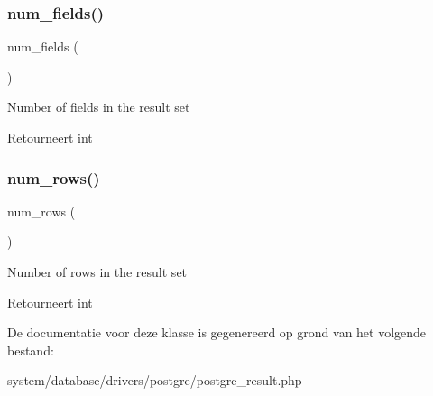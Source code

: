 \subsubsection{\texorpdfstring{num\_fields()}{num\_fields()}}
{\footnotesize\ttfamily num\+\_\+fields (\begin{DoxyParamCaption}{ }\end{DoxyParamCaption})}

Number of fields in the result set

\begin{DoxyReturn}{Retourneert}
int 
\end{DoxyReturn}
\mbox{\label{class_c_i___d_b__postgre__result_a218657c303ee499b97710ab0cd2f5d6e}} 
\subsubsection{\texorpdfstring{num\_rows()}{num\_rows()}}
{\footnotesize\ttfamily num\+\_\+rows (\begin{DoxyParamCaption}{ }\end{DoxyParamCaption})}

Number of rows in the result set

\begin{DoxyReturn}{Retourneert}
int 
\end{DoxyReturn}


De documentatie voor deze klasse is gegenereerd op grond van het volgende bestand\+:\begin{DoxyCompactItemize}
\item 
system/database/drivers/postgre/postgre\+\_\+result.\+php\end{DoxyCompactItemize}
